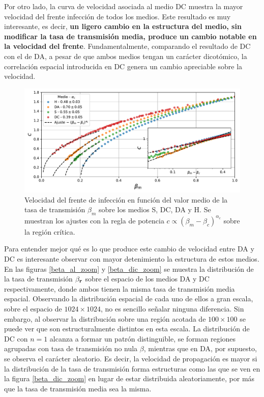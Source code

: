 Por otro lado, la curva de velocidad asociada al medio DC muestra la mayor velocidad del frente infección de todos los medios. Este resultado es muy interesante, es decir, \textbf{un ligero cambio en la estructura del medio, sin modificar la tasa de transmisión media, produce un cambio notable en la velocidad del frente}. Fundamentalmente, comparando el resultado de DC con el de DA, a pesar de que ambos medios tengan un carácter dicotómico, la correlación espacial
introducida en DC genera un cambio apreciable sobre la velocidad.

\begin{figure}[!b]
    \centering
    \includegraphics[width=\imsizeL]{c_all.pdf}
    \caption{Velocidad del frente de infección en función del valor medio de la tasa de transmisión $\beta_m$ sobre los medios S, DC, DA y 
    H. Se muestran los ajustes con la regla de potencia $c\propto(\beta_m-\beta_c)^{\alpha_c}$ sobre la región crítica.}
    \label{fig:c_all}
\end{figure}

Para entender mejor qué es lo que produce este cambio de velocidad entre DA y DC es interesante observar con mayor detenimiento la estructura de estos medios. En las 
figuras \ref{beta_al_zoom} y \ref{beta_dic_zoom} se muestra la distribución de la tasa de transmisión $\beta_{\vb r}$ sobre el espacio de los medios DA y DC respectivamente, donde ambos tienen la misma tasa de transmisión media espacial. Observando la distribución espacial de cada uno de ellos 
a gran escala, sobre el espacio de $1024\times1024$, no es sencillo señalar ninguna diferencia. Sin embargo, al observar la distribución sobre una región acotada de 
$100\times100$ se puede ver que son estructuralmente distintos en esta escala. La distribución de DC con $n=1$ alcanza a formar un patrón  
distinguible, se forman regiones agrupadas con tasa de transmisión no nula $\beta$, mientras que en DA, por supuesto, se observa el carácter aleatorio. Es decir, la velocidad de propagación es mayor si la distribución de la tasa de transmisión forma estructuras como las que se ven en la figura 
\ref{beta_dic_zoom} en lugar de estar distribuida aleatoriamente, por más que la tasa de transmisión media sea la misma.

